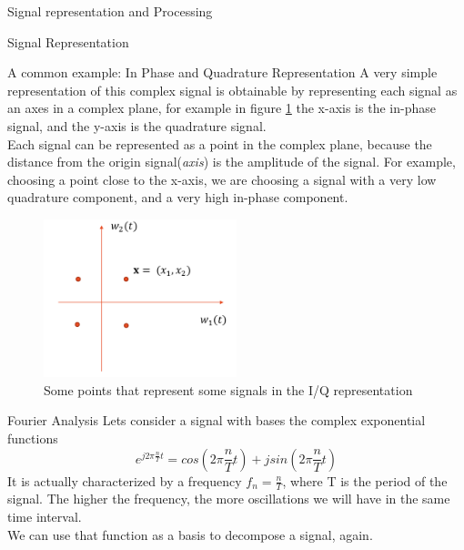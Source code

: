 \begin{section}{Signal representation and Processing}
\begin{subsection}{Signal Representation}
\begin{subsubsection}{A common example: In Phase and Quadrature Representation}
      A very simple representation of this complex signal is obtainable by representing each signal 
      as an axes in a complex plane, for example in figure \ref{fig:Complex Plane} the x-axis 
      is the in-phase signal, and the y-axis is the quadrature signal.\\
      Each signal can be represented as a point in the complex plane, because the distance from the
      origin signal(\textit{axis}) is the amplitude of the signal.
      For example, choosing a point close to the x-axis, we are choosing a signal with a very low
      quadrature component, and a very high in-phase component.\\
      \begin{figure}[h]
        \centering
        \includegraphics[width=0.5\textwidth]{img/iq representation.png}
        \caption{Some points that represent some signals in the I/Q representation}
        \label{fig:Complex Plane}
      \end{figure}
    \end{subsubsection}
  \end{subsection}
  \begin{subsection}{Fourier Analysis}
    Lets consider a signal with bases the complex exponential functions 
    \begin{equation}
      e^{j2\pi \frac{n}{T} t} = cos(2\pi \frac{n}{T} t) + j sin(2\pi \frac{n}{T} t)
    \end{equation}
    It is actually characterized by a frequency $f_n = \frac{n}{T}$, where T is the period of the
    signal. The higher the frequency, the more oscillations we will have in the same time interval.\\

    We can use that function as a basis to decompose a signal, again.
  \end{subsection}

\end{section}
